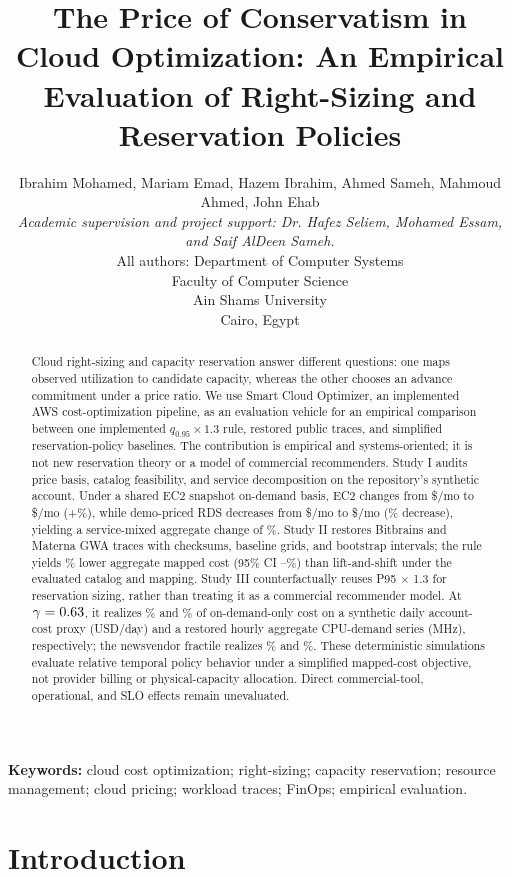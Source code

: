 \documentclass[11pt]{article}
\title{The Price of Conservatism in Cloud Optimization: An Empirical Evaluation of Right-Sizing and Reservation Policies}
\author{
\small Ibrahim Mohamed, Mariam Emad, Hazem Ibrahim, Ahmed Sameh, Mahmoud Ahmed, John Ehab\\[3pt]
\footnotesize\emph{Academic supervision and project support: Dr. Hafez Seliem, Mohamed Essam, and Saif AlDeen Sameh.}\\[3pt]
\small All authors: Department of Computer Systems\\
\small Faculty of Computer Science\\
\small Ain Shams University\\
\small Cairo, Egypt
}
\date{}
\begin{document}
\maketitle

\begin{abstract}
Cloud right-sizing and capacity reservation answer different questions: one
maps observed utilization to candidate capacity, whereas the other chooses an
advance commitment under a price ratio. We use Smart Cloud Optimizer, an
implemented AWS cost-optimization pipeline, as an evaluation vehicle for an
empirical comparison between one implemented \(q_{0.95}\times1.3\) rule,
restored public traces, and simplified reservation-policy baselines. The
contribution is empirical and systems-oriented; it is not new reservation
theory or a model of commercial recommenders. Study I audits price basis,
catalog feasibility, and service decomposition on the repository's synthetic
account. Under a shared EC2 snapshot on-demand basis, EC2 changes from
\$\evidEcTwoCurrent{}/mo to \$\evidEcTwoOptimized{}/mo
(+\evidEcTwoDeltaPct\%), while demo-priced RDS decreases from
\$\evidRdsCurrent{}/mo to \$\evidRdsOptimized{}/mo
(\evidRdsSavingsPct\% decrease), yielding a service-mixed aggregate change of
\evidAggregateDeltaPct\%. Study II restores Bitbrains and Materna GWA traces
with checksums, baseline grids, and bootstrap intervals; the rule yields
\extOverallSavingsPct\% lower aggregate mapped cost (95\% CI
\extOverallSavingsCiLow--\extOverallSavingsCiHigh\%) than lift-and-shift under
the evaluated catalog and mapping. Study III counterfactually reuses P95
\(\times\) 1.3 for reservation sizing, rather than treating it as a commercial
recommender model. At \(\gamma=0.63\), it realizes
\polPctHeur\% and \extPolPctHeur\% of on-demand-only cost on a synthetic daily
account-cost proxy (USD/day) and a restored hourly aggregate CPU-demand series
(MHz), respectively; the newsvendor fractile realizes \polPctNv\% and
\extPolPctNv\%. These deterministic simulations evaluate relative temporal
policy behavior under a simplified mapped-cost objective, not provider billing
or physical-capacity allocation. Direct commercial-tool, operational, and SLO
effects remain unevaluated.
\end{abstract}

\noindent\textbf{Keywords:} cloud cost optimization; right-sizing; capacity
reservation; resource management; cloud pricing; workload traces; FinOps;
empirical evaluation.

\section{Introduction}
\end{document}
